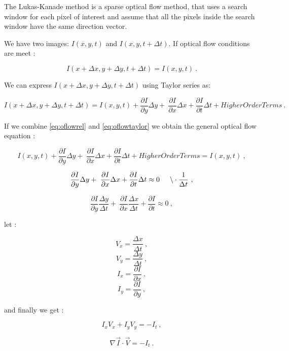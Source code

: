 The Lukas-Kanade method is a sparse optical flow method, that 
uses a search window for each pixel of interest and assume that all the pixels 
inside the search window have the same direction vector.


We have two images: $I(x,y,t)$ and $I(x,y,t+\Delta t)$.
If optical flow conditions are meet :

\begin{equation}
\label{eq:oflowrel}
I(x + \Delta x,y + \Delta y, t + \Delta t) = I(x,y,t)\ .
\end{equation}

We can express $I(x + \Delta x, y + \Delta y, t + \Delta t)$ using Taylor series as:

\begin{equation}
\label{eq:oflowtaylor}
I(x + \Delta x, y + \Delta y, t + \Delta t) = I(x,y,t) + \frac{\partial I}{\partial y} \Delta y + \
 \frac{\partial I}{\partial x} \Delta x  + \frac{\partial I}{\partial t} \Delta t + Higher Order Terms \ .
\end{equation}

If we combine \ref{eq:oflowrel} and \ref{eq:oflowtaylor} we obtain the general optical flow equation :


$$ I(x,y,t) + \frac{\partial I}{\partial y} \Delta y + \
 \frac{\partial I}{\partial x} \Delta x  + \frac{\partial I}{\partial t} \Delta t + Higher Order Terms = I(x,y,t)\ , $$


$$ \frac{\partial I}{\partial y} \Delta y + \
 \frac{\partial I}{\partial x} \Delta x  + \frac{\partial I}{\partial t} \Delta t \approx 0 \hspace{0.5cm} \backslash \cdot \frac{1}{\Delta t}\ ,  $$


$$ \frac{\partial I}{\partial y} \frac{\Delta y}{\Delta t} + \
 \frac{\partial I}{\partial x} \frac{\Delta x}{\Delta t}  + \frac{\partial I}{\partial t}  \approx 0 \ , $$


\noindent let :

$$ V_x = \frac{\Delta x}{\Delta t}\ , $$
$$ V_y = \frac{\Delta y}{\Delta t}\ , $$
$$ I_x = \frac{\partial I}{\partial x}\ ,$$
$$ I_y = \frac{\partial I}{\partial y}\ ,$$

\noindent and finally we get :

$$ I_x V_x + I_y V_y = -I_t \ ,$$

\begin{equation}
\label{eq:oflowgeneral}
\nabla{\vec{I}} \cdot \vec{V} = -I_t \ .
\end{equation}

